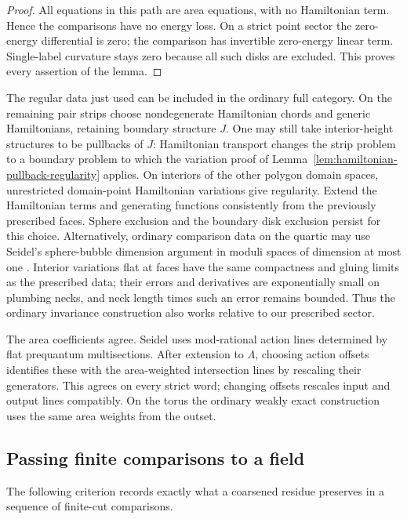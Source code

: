 \documentclass[11pt]{article}
\numberwithin{equation}{section}
\theoremstyle{definition}
\theoremstyle{remark}
\begin{document}
\begin{proof}
All equations in this path are area equations, with no
Hamiltonian term.  Hence the comparisons have no energy loss.
On a strict point sector the zero-energy differential is zero;
the comparison has invertible zero-energy linear term.
Single-label curvature stays zero because all such disks are
excluded.  This proves every assertion of the lemma.
\end{proof}

The regular data just used can be included in the ordinary full
category.  On the remaining pair strips choose nondegenerate
Hamiltonian chords and generic Hamiltonians, retaining boundary
structure $J$.  One may still take interior-height structures
to be pullbacks of $J$: Hamiltonian transport changes the strip
problem to a boundary problem to which the variation proof of
Lemma~\ref{lem:hamiltonian-pullback-regularity} applies.  On
interiors of the other polygon domain spaces, unrestricted
domain-point Hamiltonian variations give regularity.  Extend
the Hamiltonian terms and generating functions consistently
from the previously prescribed faces.  Sphere exclusion and
the boundary disk exclusion persist for this choice.  Alternatively,
ordinary comparison data on the quartic may use Seidel's
sphere-bubble dimension argument in moduli spaces of dimension
at most one \cite[Section~8c]{HMS:SeidelQuartic}.  Interior
variations flat at faces have the same compactness and gluing
limits as the prescribed data; their errors and derivatives
are exponentially small on plumbing necks, and neck length
times such an error remains bounded.  Thus the ordinary
invariance construction also works relative to our prescribed
sector.

The area coefficients agree.  Seidel uses mod-rational action
lines determined by flat prequantum multisections.  After
extension to $\Lambda$, choosing action offsets identifies
these with the area-weighted intersection lines by rescaling
their generators.  This agrees on every strict word; changing
offsets rescales input and output lines compatibly.  On the
torus the ordinary weakly exact construction uses the same
area weights from the outset.

\subsection{Passing finite comparisons to a field}

The following criterion records exactly what a coarsened residue
preserves in a sequence of finite-cut comparisons.
\end{document}
